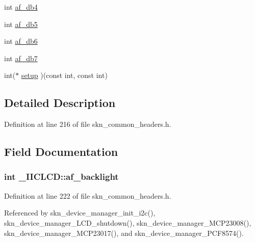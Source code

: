 \begin{DoxyCompactItemize}
\item 
int \hyperlink{struct___i_i_c_l_c_d_adbfc88b661d5da527aad6f5bcd45a85c}{af\+\_\+db4}
\item 
int \hyperlink{struct___i_i_c_l_c_d_a41c4536106493476b52c9a9df9dd8599}{af\+\_\+db5}
\item 
int \hyperlink{struct___i_i_c_l_c_d_a0f3ebbe756ecf62494733287f64821f9}{af\+\_\+db6}
\item 
int \hyperlink{struct___i_i_c_l_c_d_ae55385ca612fd157fb85e7b3d5423ee4}{af\+\_\+db7}
\item 
int($\ast$ \hyperlink{struct___i_i_c_l_c_d_ab3052517b34cbf67239b91ccbd113c00}{setup} )(const int, const int)
\end{DoxyCompactItemize}


\subsection{Detailed Description}


Definition at line 216 of file skn\+\_\+common\+\_\+headers.\+h.



\subsection{Field Documentation}
\hypertarget{struct___i_i_c_l_c_d_ad160086a31276fbaf849855519b9878e}{}
\subsubsection[{af\+\_\+backlight}]{\setlength{\rightskip}{0pt plus 5cm}int \+\_\+\+I\+I\+C\+L\+C\+D\+::af\+\_\+backlight}\label{struct___i_i_c_l_c_d_ad160086a31276fbaf849855519b9878e}


Definition at line 222 of file skn\+\_\+common\+\_\+headers.\+h.



Referenced by skn\+\_\+device\+\_\+manager\+\_\+init\+\_\+i2c(), skn\+\_\+device\+\_\+manager\+\_\+\+L\+C\+D\+\_\+shutdown(), skn\+\_\+device\+\_\+manager\+\_\+\+M\+C\+P23008(), skn\+\_\+device\+\_\+manager\+\_\+\+M\+C\+P23017(), and skn\+\_\+device\+\_\+manager\+\_\+\+P\+C\+F8574().

\hypertarget{struct___i_i_c_l_c_d_ae74954b1b96523d617a68e42c2663086}{}
